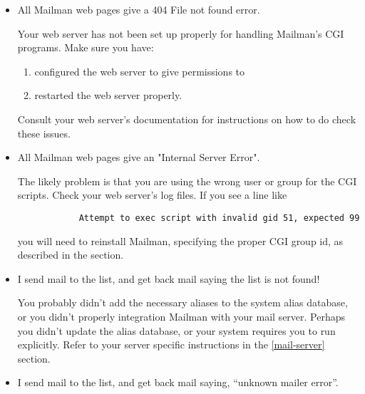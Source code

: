 \documentclass{howto}
\begin{document}
\begin{itemize}

\item {} All Mailman web pages give a 404 File not found
      error.

       Your web server has not been set up properly for
      handling Mailman's CGI programs.  Make sure you have:

      \begin{enumerate}
      \item configured the web server to give permissions to

      \item restarted the web server properly.
      \end{enumerate}

      Consult your web server's documentation for instructions on how to do
      check these issues.

\item {} All Mailman web pages give an "Internal Server
      Error".

       The likely problem is that you are using the wrong
      user or group for the CGI scripts.  Check your web server's log files.
      If you see a line like

      \begin{verbatim}
            Attempt to exec script with invalid gid 51, expected 99
      \end{verbatim}

      you will need to reinstall Mailman, specifying the proper CGI group id,
      as described in the \label{building} section.

\item {} I send mail to the list, and get back mail saying the
       list is not found!

       You probably didn't add the necessary aliases to the
      system alias database, or you didn't properly integration Mailman with
      your mail server.  Perhaps you didn't update the alias database, or your
      system requires you to run  explicitly.  Refer to
      your server specific instructions in the \ref{mail-server} section.

\item {} I send mail to the list, and get back mail saying,
      ``unknown mailer error''.


\end{itemize}
\end{document}

